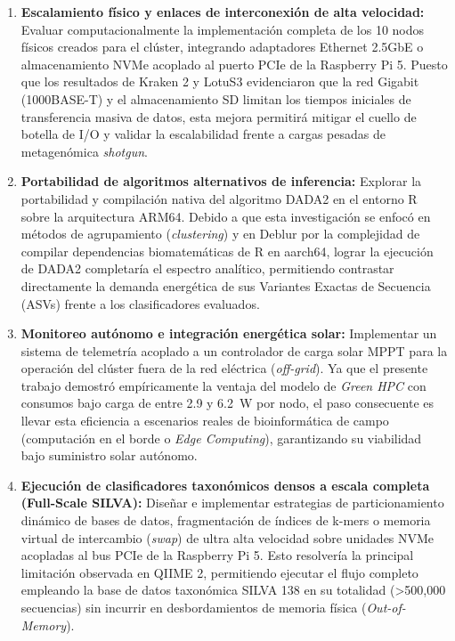 \documentclass[12pt,oneside,spanish]{book}
\begin{document}
    \begin{enumerate}
        \item \textbf{Escalamiento físico y enlaces de interconexión de alta velocidad:} Evaluar computacionalmente la implementación completa de los 10 nodos físicos creados para el clúster, integrando adaptadores Ethernet 2.5GbE o almacenamiento NVMe acoplado al puerto PCIe de la Raspberry Pi 5. Puesto que los resultados de Kraken 2 y LotuS3 evidenciaron que la red Gigabit (1000BASE-T) y el almacenamiento SD limitan los tiempos iniciales de transferencia masiva de datos, esta mejora permitirá mitigar el cuello de botella de I/O y validar la escalabilidad frente a cargas pesadas de metagenómica \textit{shotgun}.
    
        \item \textbf{Portabilidad de algoritmos alternativos de inferencia:} Explorar la portabilidad y compilación nativa del algoritmo DADA2 en el entorno R sobre la arquitectura ARM64. Debido a que esta investigación se enfocó en métodos de agrupamiento (\textit{clustering}) y en Deblur por la complejidad de compilar dependencias biomatemáticas de R en aarch64, lograr la ejecución de DADA2 completaría el espectro analítico, permitiendo contrastar directamente la demanda energética de sus Variantes Exactas de Secuencia (ASVs) frente a los clasificadores evaluados.
    
        \item \textbf{Monitoreo autónomo e integración energética solar:} Implementar un sistema de telemetría acoplado a un controlador de carga solar MPPT para la operación del clúster fuera de la red eléctrica (\textit{off-grid}). Ya que el presente trabajo demostró empíricamente la ventaja del modelo de \textit{Green HPC} con consumos bajo carga de entre 2.9 y 6.2~W por nodo, el paso consecuente es llevar esta eficiencia a escenarios reales de bioinformática de campo (computación en el borde o \textit{Edge Computing}), garantizando su viabilidad bajo suministro solar autónomo.
    
        \item \textbf{Ejecución de clasificadores taxonómicos densos a escala completa (Full-Scale SILVA):} Diseñar e implementar estrategias de particionamiento dinámico de bases de datos, fragmentación de índices de k-mers o memoria virtual de intercambio (\textit{swap}) de ultra alta velocidad sobre unidades NVMe acopladas al bus PCIe de la Raspberry Pi 5. Esto resolvería la principal limitación observada en QIIME 2, permitiendo ejecutar el flujo completo empleando la base de datos taxonómica SILVA 138 en su totalidad (>500,000 secuencias) sin incurrir en desbordamientos de memoria física (\textit{Out-of-Memory}).
    \end{enumerate}
    
\end{document}

